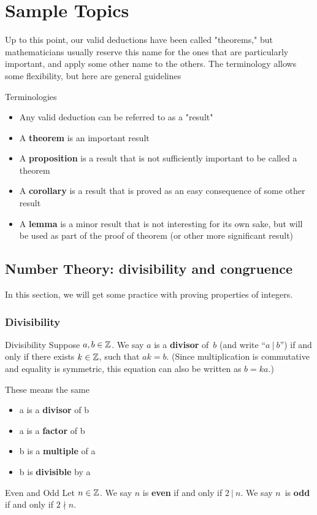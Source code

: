 \documentclass[../MATH-2000-Notes.tex]{subfiles}
\begin{document}
\chapter{Sample Topics}
Up to this point, our valid deductions have been called "theorems\rlap," but mathematicians usually reserve this name for the ones that are particularly important, and apply some other name to the others. The terminology allows some flexibility, but here are general guidelines
\begin{Definition}
    {Terminologies}~\\
    \begin{itemize}
        \item Any valid deduction can be referred to as a "result"
        \item A \textbf{theorem} is an important result
        \item A \textbf{proposition} is a result that is not sufficiently important to be called a theorem
        \item A \textbf{corollary} is a result that is proved as an easy consequence of some other result
        \item A \textbf{lemma} is a minor result that is not interesting for its own sake, but will be used as part of the proof of theorem (or other more significant result)
    \end{itemize}
\end{Definition}
\section{Number Theory: divisibility and congruence}
In this section, we will get some practice with proving properties of integers.
\subsection{Divisibility}
\begin{Definition}
    {Divisibility}
    \label{DividesDefn}
    Suppose $a,b \in \mathbb{Z}$.
    We say $a$ is a \textbf{divisor} of~$b$ (and write ``$a\ |\  b$'')
    if and only if there exists $k \in \mathbb{Z}$, such that $a k = b$. (Since multiplication is commutative and equality is symmetric, this equation can also be written as $b = ka$.)

    These means the same
    \begin{itemize}
        \item a is a \textbf{divisor} of b
        \item a is a \textbf{factor} of b
        \item b is a \textbf{multiple} of a
        \item b is \textbf{divisible} by a
    \end{itemize}
\end{Definition}
\begin{Definition}
    {Even and Odd}
    Let $n \in \mathbb{Z}$.
    We say $n$ is
    \textbf{even} if and only if $2\ |\  n$.
    We say $n$~is \textbf{odd} if and only if $2 \nmid n$.
\end{Definition}
\end{document}
